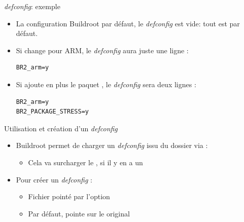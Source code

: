 \documentclass[aspectratio=169,obeyspaces,spaces,hyphens,dvipsnames]{beamer}
\begin{document}
\begin{frame}[fragile]{{\em defconfig}: exemple}
  \begin{itemize}
  \item La configuration Buildroot par défaut, le {\em defconfig}
    est vide: tout est par défaut.
  \item Si change pour ARM, le {\em defconfig} aura juste une ligne :
{\small
\begin{block}{}
\begin{verbatim}
BR2_arm=y
\end{verbatim}
\end{block}
}
\item Si ajoute en plus le paquet , le {\em defconfig}
  sera deux lignes :
{\small
\begin{block}{}
\begin{verbatim}
BR2_arm=y
BR2_PACKAGE_STRESS=y
\end{verbatim}
\end{block}
}
  \end{itemize}
\end{frame}

\begin{frame}{Utilisation et création d'un {\em defconfig}}
  \begin{itemize}
  \item Buildroot permet de charger un {\em defconfig} issu du dossier
     via :
    \begin{itemize}
    \item Cela va surcharger le , si il y en a un
    \end{itemize}
  \item Pour créer un {\em defconfig} :
    \begin{itemize}
    \item Fichier pointé par l'option 
    \item Par défaut, pointe sur le  original
    \end{itemize}
  \end{itemize}
\end{frame}
\end{document}
